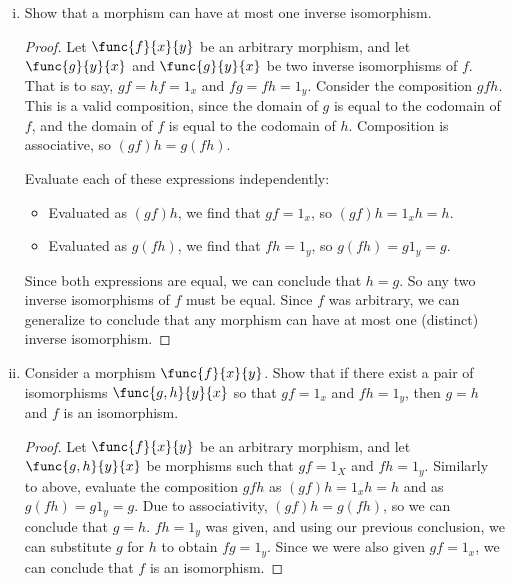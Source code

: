 \documentclass[main.tex]{subfiles}
\begin{document}
\begin{exercise}\leavevmode
	\begin{enumerate}[(i)]
		\item Show that a morphism can have at most one inverse isomorphism.
			\begin{proof}
				Let \(\func{f}{x}{y}\) be an arbitrary morphism, and let
				\(\func{g}{y}{x}\) and \(\func{g}{y}{x}\) be two inverse
				isomorphisms of \(f\). That is to say, \(gf=hf=1_{x}\) and
				\(fg=fh=1_{y}\). Consider the composition \(gfh\). This is a
				valid composition, since the domain of \(g\) is equal to the
				codomain of \(f\), and the domain of \(f\) is equal to the
				codomain of \(h\). Composition is associative, so \((gf)h =
				g(fh)\).

				Evaluate each of these expressions independently:
				\begin{itemize}
					\item Evaluated as \((gf)h\), we find that \(gf=1_{x}\), so
						\((gf)h=1_{x}h=h\).
					\item Evaluated as \(g(fh)\), we find that \(fh=1_{y}\), so
						\(g(fh)=g1_{y}=g\).
				\end{itemize}

				Since both expressions are equal, we can conclude that \(h=g\).
				So any two inverse isomorphisms of \(f\) must be equal. Since
				\(f\) was arbitrary, we can generalize to conclude that any
				morphism can have at most one (distinct) inverse isomorphism.
			\end{proof}

		\item Consider a morphism \(\func{f}{x}{y}\). Show that if there exist a
			pair of isomorphisms \(\func{g,h}{y}{x}\) so that \(gf=1_{x}\) and
			\(fh=1_{y}\), then \(g=h\) and \(f\) is an isomorphism.\\
			\begin{proof}
				Let \(\func{f}{x}{y}\) be an arbitrary morphism, and let
				\(\func{g,h}{y}{x}\) be morphisms such that \(gf=1_{X}\) and
				\(fh=1_{y}\). Similarly to above, evaluate the composition
				\(gfh\) as \((gf)h=1_{x}h=h\) and as \(g(fh)=g1_{y}=g\). Due to
				associativity, \((gf)h=g(fh)\), so we can conclude that \(g=h\).
				\(fh=1_{y}\) was given, and using our previous conclusion, we can
				substitute \(g\) for \(h\) to obtain \(fg=1_{y}\). Since we were
				also given \(gf=1_{x}\), we can conclude that \(f\) is an
				isomorphism.
			\end{proof}
	\end{enumerate}
\end{exercise}
\end{document}
